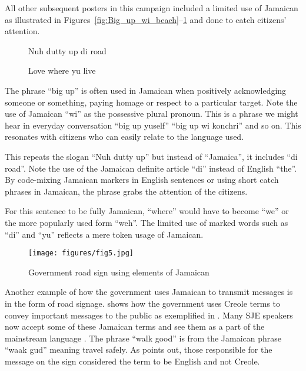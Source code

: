 \documentclass[output=paper,colorlinks,citecolor=brown]{langscibook}
\begin{document}
All other subsequent posters in this campaign included a limited use of Jamaican as illustrated in Figures~\ref{fig:Big_up_wi_beach}--\ref{fig:Love_where_yu_live} and done to catch citizens' attention.


\begin{figure}
\begin{floatrow}
  \captionsetup{margin=.05\linewidth}%
          {\caption{Nuh dutty up di road \citep{JamaicaEnvironmentTrust2016}\label{fig:Nuh_dutty_up_di road}}}%
          {\caption{Love where yu live \citep{JamaicaEnvironmentTrust2016}\label{fig:Love_where_yu_live}}}%
\end{floatrow}    
\end{figure}

The phrase “big up” is often used in Jamaican when positively acknowledging someone or something, paying homage or respect to a particular target. Note the use of Jamaican “wi” as the possessive plural pronoun. This is a phrase we might hear in everyday conversation “big up yuself” “big up wi konchri” and so on. This resonates with citizens who can easily relate to the language used.

This repeats the slogan “Nuh dutty up” but instead of “Jamaica”, it includes “di road”. Note the use of the Jamaican definite article “di” instead of English “the”. By code-mixing Jamaican markers in English sentences or using short catch phrases in Jamaican, the phrase grabs the attention of the citizens.

For this sentence to be fully Jamaican, “where” would have to become “we” or the more popularly used form “weh”. The limited use of marked words such as “di” and “yu” reflects a mere token usage of Jamaican.

\begin{figure}
    \centering
    \texttt{[image: figures/fig5.jpg]}
    \caption{Government road sign using elements of Jamaican \citep{Dray2010}\label{fig:fig5}}
\end{figure}

Another example of how the government uses Jamaican to transmit messages is in the form of road signage. \citet{Dray2010} shows how the government uses Creole terms to convey important messages to the public as exemplified in . Many SJE speakers now accept some of these Jamaican terms and see them as a part of the mainstream language \citep{Christie2003,Irvine2005}. The phrase “walk good” is from the Jamaican phrase “waak gud” meaning travel safely. As \citet{Dray2010} points out, those responsible for the message on the sign considered the term to be English and not Creole.
\end{document}
